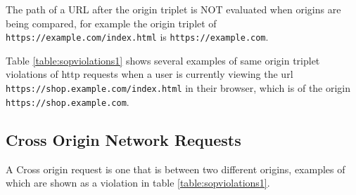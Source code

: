 \documentclass{mscreport}
\begin{document}
\vspace{0.3cm} \noindent
The path of a URL after the origin triplet is NOT evaluated when origins are being compared, for example the origin triplet of \texttt{https://example.com/index.html} is \newline \texttt{https://example.com}.

\vspace{0.3cm} \noindent
Table \ref{table:sopviolations1} shows several examples of same origin triplet violations of http requests when a user is currently viewing the url \texttt{https://shop.example.com/index.html} in their browser, which is of the origin \texttt{https://shop.example.com}.

\begin{table}[h!]
  \begin{center}
    \caption{Same Origin triplet example violations}
    \label{table:sopviolations1} %
  \end{center}
\end{table}

\subsection{Cross Origin Network Requests}
A Cross origin request is one that is between two different origins, examples of which are shown as a violation in table \ref{table:sopviolations1}.
\end{document}
